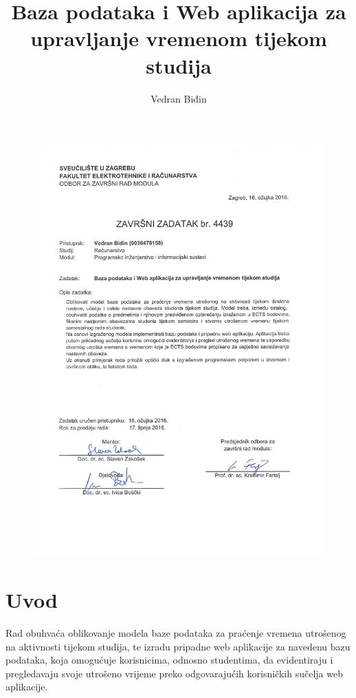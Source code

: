 \documentclass[times, utf8, zavrsni]{fer}
\begin{document}

\title{Baza podataka i Web aplikacija za upravljanje vremenom tijekom studija}

\author{Vedran Biđin}

\maketitle
\begin{figure}[H]
\centering
\includegraphics[width=\textwidth]{img/izvornik.pdf}
\label{izvornik}
\end{figure}

\zahvala{}

\tableofcontents

\chapter{Uvod}
Rad obuhvaća oblikovanje modela baze podataka za praćenje vremena utrošenog na aktivnosti tijekom studija, te izradu pripadne web aplikacije za navedenu bazu podataka, koja omogućuje korisnicima, odnosno studentima, da evidentiraju i pregledavaju svoje utrošeno vrijeme preko odgovarajućih korisničkih sučelja web aplikacije.
\end{document}
